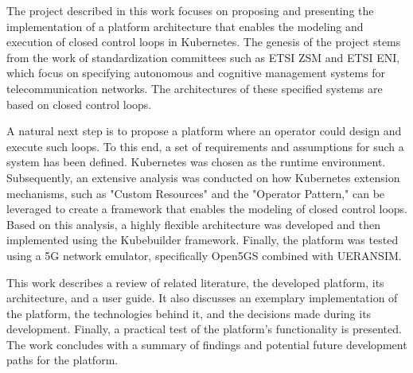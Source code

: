 The project described in this work focuses on proposing and presenting the implementation of a platform architecture that enables the modeling and execution of closed control loops in Kubernetes. The genesis of the project stems from the work of standardization committees such as ETSI ZSM and ETSI ENI, which focus on specifying autonomous and cognitive management systems for telecommunication networks. The architectures of these specified systems are based on closed control loops.

A natural next step is to propose a platform where an operator could design and execute such loops. To this end, a set of requirements and assumptions for such a system has been defined. Kubernetes was chosen as the runtime environment. Subsequently, an extensive analysis was conducted on how Kubernetes extension mechanisms, such as "Custom Resources" and the "Operator Pattern," can be leveraged to create a framework that enables the modeling of closed control loops. Based on this analysis, a highly flexible architecture was developed and then implemented using the Kubebuilder framework. Finally, the platform was tested using a 5G network emulator, specifically Open5GS combined with UERANSIM.

This work describes a review of related literature, the developed platform, its architecture, and a user guide. It also discusses an exemplary implementation of the platform, the technologies behind it, and the decisions made during its development. Finally, a practical test of the platform's functionality is presented. The work concludes with a summary of findings and potential future development paths for the platform.